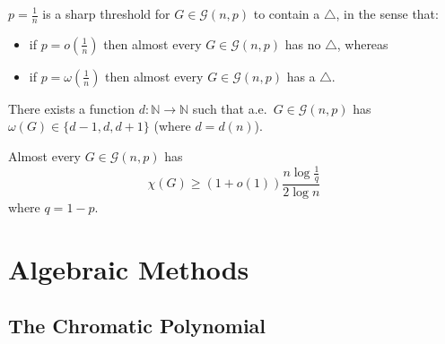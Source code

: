 \documentclass{article}
\begin{document}
\begin{nprop}\label{prop:40}
    $p = \frac{1}{n}$ is a sharp threshold for $G \in \mathcal{G}(n,p)$ to contain a $\triangle$, in the sense that:
    \begin{itemize}
        \item if $p = o(\frac{1}{n})$ then almost every $G \in \mathcal{G}(n,p)$ has no $\triangle$, whereas
        \item if $p = \omega(\frac{1}{n})$ then almost every $G \in \mathcal{G}(n,p)$ has a $\triangle$.
    \end{itemize}
\end{nprop}





\begin{nthm}\label{thm:41}
    There exists a function $d: \mathbb{N} \to \mathbb{N}$ such that a.e.\ $G \in \mathcal{G}(n,p)$ has $\omega(G) \in \{d-1,d,d+1\}$ (where $d = d(n)$).
\end{nthm}


\begin{ncor}\label{cor:42}
    Almost every $G \in \mathcal{G}(n,p)$ has
    \begin{equation*}
        \chi(G) \geq (1 + o(1))\frac{n \log \frac{1}{q}}{2 \log n}
    \end{equation*}
    where $q = 1-p.$
\end{ncor}




\clearpage
\section{Algebraic Methods}



























\subsection{The Chromatic Polynomial}
\end{document}
